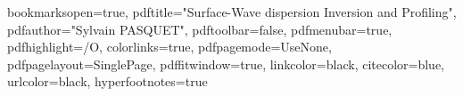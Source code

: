 \hypersetup
{
bookmarksopen=true,
pdftitle="Surface-Wave dispersion Inversion and Profiling",
pdfauthor="Sylvain PASQUET", %
pdftoolbar=false, %
pdfmenubar=true, %
pdfhighlight=/O, %
colorlinks=true, %
pdfpagemode=UseNone, %
pdfpagelayout=SinglePage, %
pdffitwindow=true, %
linkcolor=black, %
citecolor=blue, %
urlcolor=black, %
hyperfootnotes=true
}
